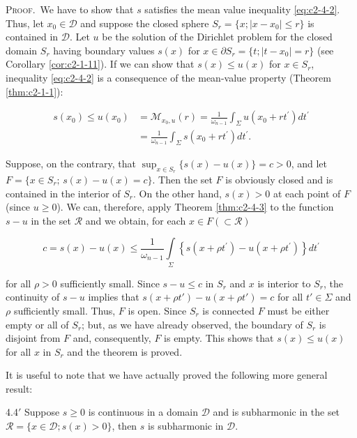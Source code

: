 \textsc{Proof.}\ We have to show that $s$ satisfies the mean value inequality \eqref{eq:c2-4-2}. Thus, let $x_0 \in \mathcal{D}$ and suppose the closed sphere $S_r = \{x; |x - x_0| \leq r\}$ is contained in $\mathcal{D}$. Let $u$ be the solution of the Dirichlet problem for the closed domain $S_r$ having boundary values $s(x)$ for $x \in \partial S_r = \{t; |t - x_0| = r\}$ (see Corollary \ref{cor:c2-1-11}). If we can show that $s(x) \leq u(x)$ for $x \in S_r$, inequality \eqref{eq:c2-4-2} is a consequence of the mean-value property (Theorem \ref{thm:c2-1-1}):

\[
\begin{aligned}s(x_{0})\leq u(x_{0})&=\mathcal{M}_{x_{0},u}(r)=\frac{1}{\omega_{n-1}}\int_{\Sigma}u(x_{0}+rt^{\prime})dt^{\prime}\\&=\frac{1}{\omega_{n-1}}\int_{\Sigma}s(x_{0}+rt^{\prime})dt^{\prime}.\end{aligned}
\]

Suppose, on the contrary, that $\sup_{x\in S_r}\{s(x)-u(x)\}=c>0$, and let $F=\{x\in S_r;\,s(x)-u(x)=c\}$. Then the set $F$ is obviously closed and is contained in the interior of $S_r$. On the other hand, $s(x)>0$ at each point of $F$ (since $u\geq0$). We can, therefore, apply Theorem \ref{thm:c2-4-3} to the function $s-u$ in the set $\mathcal{R}$ and we obtain, for each $x\in F(\subset\mathcal{R})$

\[
c=s(x)-u(x)\leq\frac{1}{\omega_{n-1}}\int\limits_{\Sigma}\left\{s(x+\rho t^{\prime})-u(x+\rho t^{\prime})\right\}d t^{\prime}
\]

for all $\rho > 0$ sufficiently small. Since $s - u \leq c$ in $S_r$ and $x$ is interior to $S_r$, the continuity of $s - u$ implies that $s(x + \rho t') - u(x + \rho t') = c$ for all $t' \in \Sigma$ and $\rho$ sufficiently small. Thus, $F$ is open. Since $S_r$ is connected $F$ must be either empty or all of $S_r$; but, as we have already observed, the boundary of $S_r$ is disjoint from $F$ and, consequently, $F$ is empty. This shows that $s(x) \leq u(x)$ for all $x$ in $S_r$ and the theorem is proved.

It is useful to note that we have actually proved the following more general result:

\begin{customthm}{4.4$'$}
\label{thm:c2-4-4p}
Suppose $s \geq 0$ is continuous in a domain $\mathcal{D}$ and is subharmonic in the set $\mathcal{R} = \{x \in \mathcal{D}; s(x) > 0\}$, then $s$ is subharmonic in $\mathcal{D}$.
\end{customthm}


